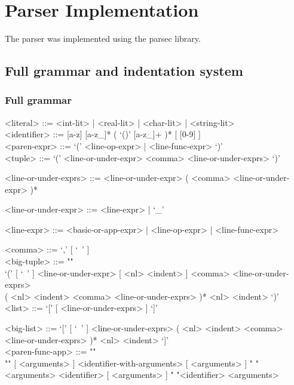 \documentclass{article}
\begin{document}
\section{Parser Implementation}

The parser was implemented using the parsec library.

\subsection{Full grammar and indentation system}

\subsubsection{Full grammar}

\begin{grammar}

<literal> ::= <int-lit> | <real-lit> | <char-lit> | <string-lit>
\\

<identifier> ::= [a-z] [a-z_]* ( `()' [a-z_]+ )* [ [0-9] ]
\\

<paren-expr> ::= `(' <line-op-expr> | <line-func-expr> `)'  
\\

<tuple> ::= `(' <line-or-under-expr> <comma> <line-or-under-exprs> `)'

<line-or-under-exprs> ::= <line-or-under-expr> ( <comma> <line-or-under-expr> )*

<line-or-under-expr> ::= <line-expr> | `_'

<line-expr> ::= <basic-or-app-expr> | <line-op-expr> | <line-func-expr>

<comma> ::= `,' [ `\ ' ]
\\

<big-tuple> ::= ""\\
`(' [ `\ ' ] <line-or-under-expr> [ <nl> <indent> ]
<comma> <line-or-under-exprs> \\
( <nl> <indent> <comma> <line-or-under-exprs> )* 
<nl> <indent> `)'
\\

<list> ::= `[' [ <line-or-under-exprs> ] `]'

<big-list> ::= 
`[' [ `\ ' ] <line-or-under-exprs>
( <nl> <indent> <comma> <line-or-under-exprs> )* <nl> <indent> `]'
\\

<paren-func-app> ::= ""\\""
[ <arguments> ] <identifier-with-arguments> [ <arguments> ]
\alt " "<arguments> <identifier> [ <arguments> ]
\alt " "<identifier> <arguments>


\end{grammar}
\end{document}
